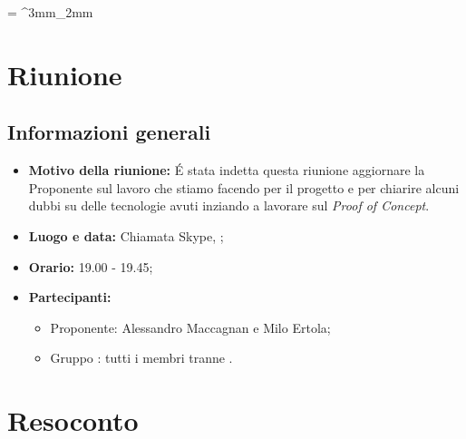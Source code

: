 \documentclass[VER-2018-01-09.tex]{subfiles}
\begin{document}
\tabulinesep = ^3mm_2mm
\chapter{Riunione}
\section{Informazioni generali}
\begin{itemize}
	\item \textbf{Motivo della riunione:} \'{E} stata indetta questa riunione aggiornare la Proponente sul lavoro che stiamo facendo per il progetto e per chiarire alcuni dubbi su delle tecnologie avuti inziando a lavorare sul \textit{Proof of Concept}.
	\item \textbf{Luogo e data:} Chiamata Skype, ;
	\item \textbf{Orario:} 19.00 - 19.45;
	\item \textbf{Partecipanti:}
	\begin{itemize}
		\item Proponente: Alessandro Maccagnan e Milo Ertola;
		\item Gruppo \gruppo: tutti i membri tranne \Gianluca.
	\end{itemize}
\end{itemize}

\chapter{Resoconto}
\end{document}
